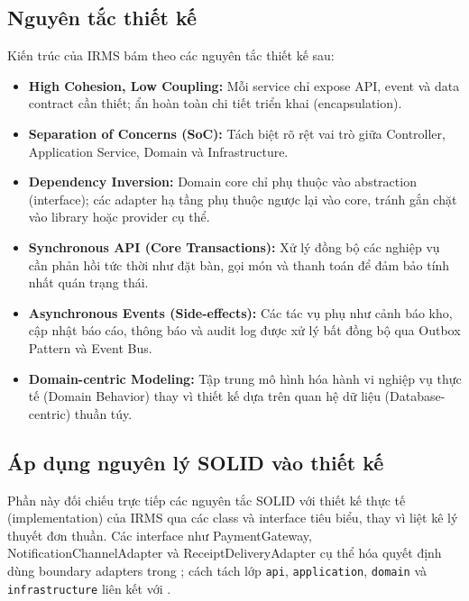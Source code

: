 \subsection{Nguyên tắc thiết kế}\label{sec:architecture-principles}
Kiến trúc của IRMS bám theo các nguyên tắc thiết kế sau:
\begin{itemize}
  \item \textbf{High Cohesion, Low Coupling:} Mỗi service chỉ expose API, event và data contract cần thiết; ẩn hoàn toàn chi tiết triển khai (encapsulation).
  \item \textbf{Separation of Concerns (SoC):} Tách biệt rõ rệt vai trò giữa Controller, Application Service, Domain và Infrastructure.
  \item \textbf{Dependency Inversion:} Domain core chỉ phụ thuộc vào abstraction (interface); các adapter hạ tầng phụ thuộc ngược lại vào core, tránh gắn chặt vào library hoặc provider cụ thể.
  \item \textbf{Synchronous API (Core Transactions):} Xử lý đồng bộ các nghiệp vụ cần phản hồi tức thời như đặt bàn, gọi món và thanh toán để đảm bảo tính nhất quán trạng thái.
  \item \textbf{Asynchronous Events (Side-effects):} Các tác vụ phụ như cảnh báo kho, cập nhật báo cáo, thông báo và audit log được xử lý bất đồng bộ qua Outbox Pattern và Event Bus.
  \item \textbf{Domain-centric Modeling:} Tập trung mô hình hóa hành vi nghiệp vụ thực tế (Domain Behavior) thay vì thiết kế dựa trên quan hệ dữ liệu (Database-centric) thuần túy.
\end{itemize}

\subsection{Áp dụng nguyên lý SOLID vào thiết kế}\label{sec:solid-design}

Phần này đối chiếu trực tiếp các nguyên tắc SOLID với thiết kế thực tế (implementation) của IRMS qua các class và interface tiêu biểu, thay vì liệt kê lý thuyết đơn thuần. Các interface như \textsf{PaymentGateway}, \textsf{NotificationChannelAdapter} và \textsf{ReceiptDeliveryAdapter} cụ thể hóa quyết định dùng boundary adapters trong ; cách tách lớp \texttt{api}, \texttt{application}, \texttt{domain} và \texttt{infrastructure} liên kết với .

